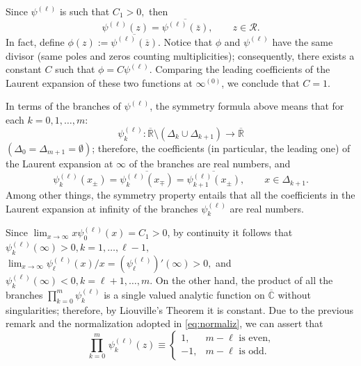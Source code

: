\documentclass{amsart}
\theoremstyle{definition}
\theoremstyle{remark}
\begin{document}
Since $\psi^{(\ell)} $ is such that $C_1 >0,$
then
\[ \psi^{(\ell)} (z) = \overline{\psi^{(\ell)} (\overline{z})}, \qquad z \in
\mathcal{R}.
\]
In fact, define $\phi(z) := \overline{\psi^{(\ell)} (\overline{z})}$.
Notice that $\phi$ and $\psi^{(\ell)} $ have the same divisor (same poles and zeros counting multiplicities); consequently, there
exists a constant $C$ such that $\phi= C\psi^{(\ell)} $. Comparing the
leading coefficients of the Laurent expansion of these two functions
at $\infty^{(0)}$,  we conclude that $C=1$.

\medskip

In terms of the branches of $\psi^{(\ell)}$, the symmetry formula
above means that  for each  $k= 0,1,\ldots,m$:
\[
\psi_k^{(\ell)}: \overline{\mathbb{R}} \setminus
( {\Delta}_k\cup  {\Delta}_{k+1})
\longrightarrow \overline{\mathbb{R}}
\]
$( {\Delta}_0 =  {\Delta}_{m+1}=\emptyset)$;
therefore, the coefficients (in particular, the leading one) of the
Laurent expansion at $\infty$ of the branches are real numbers, and
\begin{equation}  \label{contacto}\psi_k^{(\ell)}(x_{\pm}) = \overline{\psi _k^{(\ell)}(x_{\mp})} =
\overline{\psi_{k+1}^{(\ell)}(x_{\pm})}, \qquad x \in
{\Delta}_{k+1}. \end{equation}
Among other things, the symmetry property entails
that all the coefficients in the Laurent expansion at infinity of the branches $\psi^{(\ell)}_k$ are real numbers.

\medskip

Since $\lim_{x \to \infty} x \psi_0^{(\ell)}(x) = C_1 > 0$, by continuity it follows that $\psi_k^{(\ell)}(\infty) > 0, k=1,\ldots,\ell-1, $
$\lim_{x\to \infty} \psi^{(\ell)}_\ell(x)/x = (\psi^{(\ell)}_\ell)'(\infty) > 0,$ and $\psi_k^{(\ell)}(\infty) < 0, k=\ell + 1,\ldots,m $. On the other hand, the product of all the branches $\prod_{k=0}^{m}
\psi_{k}^{(\ell)}$ is a single valued analytic function on
$\overline{\mathbb{C}}$ without singularities; therefore, by Liouville's
Theorem it is constant. Due to the previous remark and the normalization adopted in \eqref{eq:normaliz}, we can assert that
\begin{equation}\label{ident} \prod_{k=0}^{m}\,\psi_{k}^{(\ell)}(z) \equiv
\left\{
\begin{array}{rl}
1, & m-\ell\,\, \mbox{is even,} \\
-1, & m -\ell\,\, \mbox{is odd.}
\end{array}
 \right.
\end{equation}
\end{document}
